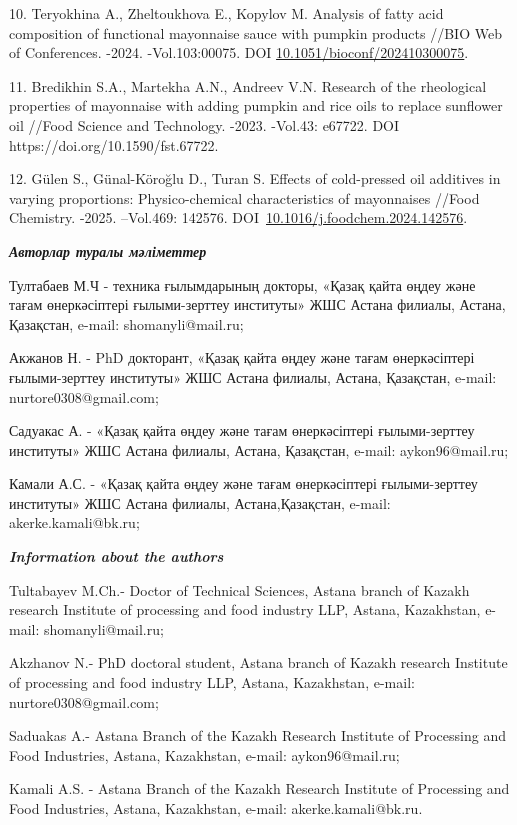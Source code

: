 \begin{refs}
10. Teryokhina A., Zheltoukhova E., Kopylov M. Analysis of fatty acid
composition of functional mayonnaise sauce with pumpkin products //BIO
Web of Conferences. -2024. -Vol.103:00075. DOI
\href{https://doi.org/10.1051/bioconf/202410300075}{10.1051/bioconf/202410300075}.

11. Bredikhin S.A., Martekha A.N., Andreev V.N. Research of the
rheological properties of mayonnaise with adding pumpkin and rice oils
to replace sunflower oil //Food Science and Technology. -2023. -Vol.43:
e67722. DOI https://doi.org/10.1590/fst.67722.

12. Gülen S., Günal-Köroğlu D., Turan S. Effects of cold-pressed oil
additives in varying proportions: Physico-chemical characteristics of
mayonnaises //Food Chemistry. -2025. --Vol.469: 142576.
DOI~\href{https://doi.org/10.1016/j.foodchem.2024.142576}{10.1016/j.foodchem.2024.142576}.
\end{refs}

\begin{info}
\hspace{1em}\emph{{\bfseries Авторлар туралы мәліметтер}}

Тултабаев М.Ч - техника ғылымдарының докторы, «Қазақ қайта өңдеу және
тағам өнеркәсіптері ғылыми-зерттеу институты» ЖШС Астана филиалы,
Астана, Қазақстан, e-mail: shomanyli@mail.ru;

Акжанов Н. - PhD докторант, «Қазақ қайта өңдеу және тағам
өнеркәсіптері ғылыми-зерттеу институты» ЖШС Астана филиалы, Астана,
Қазақстан, e-mail: nurtore0308@gmail.com;

Садуакас А. - «Қазақ қайта өңдеу және тағам өнеркәсіптері
ғылыми-зерттеу институты» ЖШС Астана филиалы, Астана, Қазақстан,
e-mail: aykon96@mail.ru;

Камали А.С. - «Қазақ қайта өңдеу және тағам өнеркәсіптері
ғылыми-зерттеу институты» ЖШС Астана филиалы, Астана,Қазақстан,
e-mail: akerke.kamali@bk.ru;

\hspace{1em}\emph{{\bfseries Information about the authors}}

Tultabayev M.Ch.- Doctor of Technical Sciences, Astana branch of
Kazakh research Institute of processing and food industry LLP, Astana,
Kazakhstan, e-mail: shomanyli@mail.ru;

Akzhanov N.- PhD doctoral student, Astana branch of Kazakh research
Institute of processing and food industry LLP, Astana, Kazakhstan,
e-mail: nurtore0308@gmail.com;

Saduakas A.- Astana Branch of the Kazakh Research Institute of
Processing and Food Industries, Astana, Kazakhstan, e-mail:
aykon96@mail.ru;

Kamali A.S. - Astana Branch of the Kazakh Research Institute of
Processing and Food Industries, Astana, Kazakhstan, e-mail:
akerke.kamali@bk.ru.
\end{info}
